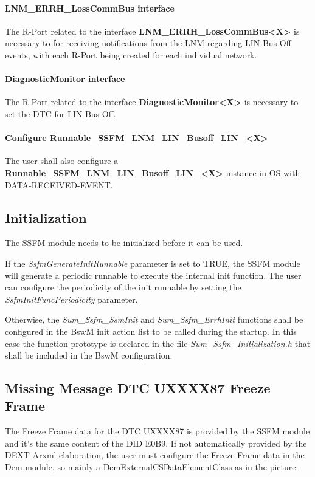 \paragraph{LNM\_ERRH\_LossCommBus interface}
The R-Port related to the interface \textbf{LNM\_ERRH\_LossCommBus<X>} is necessary to for receiving notifications from the LNM regarding LIN Bus Off events, with each R-Port being created for each individual network.

\paragraph{DiagnosticMonitor interface}
The R-Port related to the interface \textbf{DiagnosticMonitor<X>} is necessary to set the DTC for LIN Bus Off.

\paragraph{Configure Runnable\_SSFM\_LNM\_LIN\_Busoff\_LIN\_<X>}
The user shall also configure a \textbf{Runnable\_SSFM\_LNM\_LIN\_Busoff\_LIN\_<X>} instance in OS with DATA-RECEIVED-EVENT.

\subsection{Initialization}
\label{subsec:initialization}
The SSFM module needs to be initialized before it can be used. 

If the \textit{SsfmGenerateInitRunnable} parameter is set to TRUE, the SSFM module will generate a periodic runnable to execute the internal init function. 
The user can configure the periodicity of the init runnable by setting the \textit{SsfmInitFuncPeriodicity} parameter. 

Otherwise, the \textit{Sum\_Ssfm\_SsmInit} and \textit{Sum\_Ssfm\_ErrhInit} functions shall be configured in the BswM init action list to be called during the startup. 
In this case the function prototype is declared in the file \textit{Sum\_Ssfm\_Initialization.h} that shall be included in the BswM configuration.

\subsection{Missing Message DTC UXXXX87 Freeze Frame}
\label{sec:87ff}
The Freeze Frame data for the DTC UXXXX87 is provided by the SSFM module and it's the same content of the DID E0B9. 
If not automatically provided by the DEXT Arxml elaboration, the user must configure the Freeze Frame data in the Dem module, so mainly a DemExternalCSDataElementClass as in the picture:

